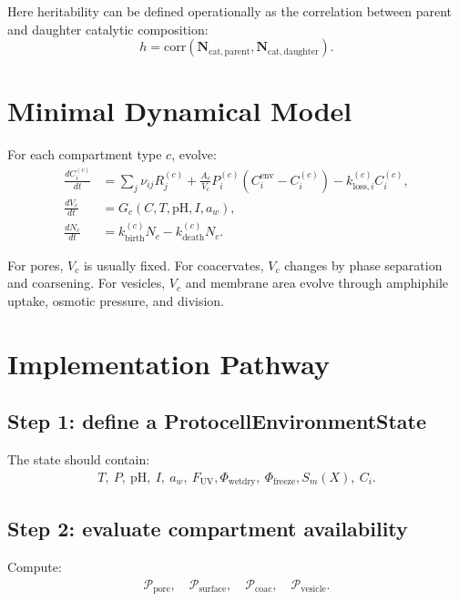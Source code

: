 \documentclass[11pt]{article}
\begin{document}
Here heritability can be defined operationally as the correlation between
parent and daughter catalytic composition:
\begin{equation}
    h =
    \mathrm{corr}
    \left(
    \mathbf{N}_{\mathrm{cat,parent}},
    \mathbf{N}_{\mathrm{cat,daughter}}
    \right).
\end{equation}

\section{Minimal Dynamical Model}

For each compartment type $c$, evolve:
\begin{align}
    \frac{dC_i^{(c)}}{dt}
    &=
    \sum_j \nu_{ij} R_j^{(c)}
    +
    \frac{A_c}{V_c}
    P_i^{(c)}
    \left(C_i^{\mathrm{env}}-C_i^{(c)}\right)
    -
    k_{\mathrm{loss},i}^{(c)} C_i^{(c)}, \\
    \frac{dV_c}{dt}
    &=
    G_c(C,T,\mathrm{pH},I,a_w), \\
    \frac{dN_c}{dt}
    &=
    k_{\mathrm{birth}}^{(c)}N_c
    -
    k_{\mathrm{death}}^{(c)}N_c.
\end{align}

For pores, $V_c$ is usually fixed. For coacervates, $V_c$ changes by phase
separation and coarsening. For vesicles, $V_c$ and membrane area evolve through
amphiphile uptake, osmotic pressure, and division.

\section{Implementation Pathway}

\subsection{Step 1: define a ProtocellEnvironmentState}

The state should contain:
\begin{align}
    T,\ P,\ \mathrm{pH},\ I,\ a_w,\ F_{\mathrm{UV}},
    \Phi_{\mathrm{wetdry}},\ \Phi_{\mathrm{freeze}},
    S_m(X),\ C_i.
\end{align}

\subsection{Step 2: evaluate compartment availability}

Compute:
\begin{align}
    \mathcal{P}_{\mathrm{pore}},\quad
    \mathcal{P}_{\mathrm{surface}},\quad
    \mathcal{P}_{\mathrm{coac}},\quad
    \mathcal{P}_{\mathrm{vesicle}}.
\end{align}
\end{document}
